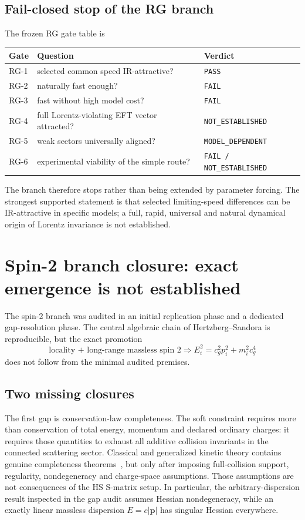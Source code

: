 \documentclass[11pt,a4paper]{article}
\begin{document}
\subsection{Fail-closed stop of the RG branch}
The frozen RG gate table is
\begin{center}
\begin{tabular}{lll}
\toprule
Gate & Question & Verdict\\
\midrule
RG-1 & selected common speed IR-attractive? & \texttt{PASS}\\
RG-2 & naturally fast enough? & \texttt{FAIL}\\
RG-3 & fast without high model cost? & \texttt{FAIL}\\
RG-4 & full Lorentz-violating EFT vector attracted? & \texttt{NOT\_ESTABLISHED}\\
RG-5 & weak sectors universally aligned? & \texttt{MODEL\_DEPENDENT}\\
RG-6 & experimental viability of the simple route? & \texttt{FAIL / NOT\_ESTABLISHED}\\
\bottomrule
\end{tabular}
\end{center}
The branch therefore stops rather than being extended by parameter forcing.  The strongest supported statement is that selected limiting-speed differences can be IR-attractive in specific models; a full, rapid, universal and natural dynamical origin of Lorentz invariance is not established.


\section{Spin-2 branch closure: exact emergence is not established}
\label{sec:spin2-closure}
The spin-2 branch was audited in an initial replication phase and a dedicated gap-resolution phase. The central algebraic chain of Hertzberg--Sandora is reproducible, but the exact promotion
\begin{equation}
\text{locality + long-range massless spin 2}
\Longrightarrow
E_i^2=c_g^2p_i^2+m_i^2c_g^4
\end{equation}
does not follow from the minimal audited premises.

\subsection{Two missing closures}
The first gap is conservation-law completeness. The soft constraint requires more than conservation of total energy, momentum and declared ordinary charges: it requires those quantities to exhaust all additive collision invariants in the connected scattering sector. Classical and generalized kinetic theory contains genuine completeness theorems~\cite{arkeryd1990,spohn2006,ern1998}, but only after imposing full-collision support, regularity, nondegeneracy and charge-space assumptions. Those assumptions are not consequences of the HS S-matrix setup. In particular, the arbitrary-dispersion result inspected in the gap audit assumes Hessian nondegeneracy, while an exactly linear massless dispersion $E=c|\mathbf p|$ has singular Hessian everywhere.
\end{document}
